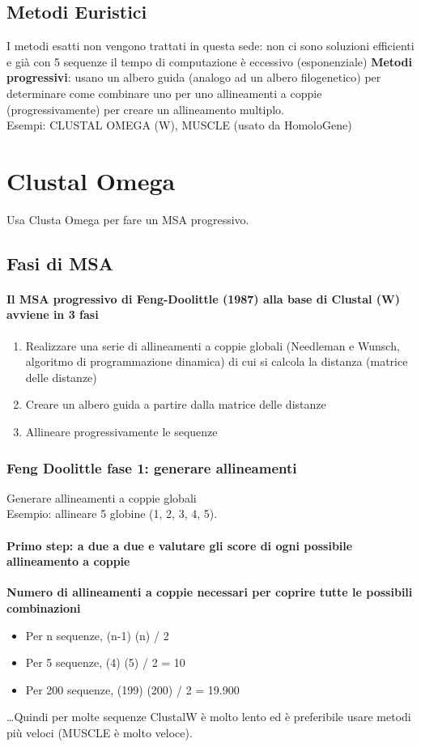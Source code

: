 \documentclass{article}
\begin{document}
\subsection{Metodi Euristici}
I metodi esatti non vengono trattati in questa sede: non ci sono soluzioni efficienti e già con 5 sequenze il tempo di computazione è eccessivo (esponenziale)
\textbf{Metodi progressivi}: usano un albero guida (analogo ad un albero filogenetico) per determinare come combinare uno per uno allineamenti a coppie
(progressivamente) per creare un allineamento multiplo.\\
Esempi: CLUSTAL OMEGA (W), MUSCLE (usato da HomoloGene)
\section{Clustal Omega}
Usa Clusta Omega per fare un MSA progressivo.
\subsection{Fasi di MSA}
\paragraph{Il MSA progressivo di Feng-Doolittle (1987) alla base di Clustal (W) avviene in 3 fasi}
\begin{enumerate}
    \item Realizzare una serie di allineamenti a coppie globali (Needleman e Wunsch, algoritmo di programmazione dinamica) di cui si calcola la distanza (matrice delle distanze)
    \item Creare un albero guida a partire dalla matrice delle distanze
    \item Allineare progressivamente le sequenze
\end{enumerate}
\subsubsection{Feng Doolittle fase 1: generare allineamenti}
\normalsize{Generare allineamenti a coppie globali}\\
\small{Esempio: allineare 5 globine (1, 2, 3, 4, 5).}\\
\paragraph{Primo step: a due a due e valutare gli score di ogni possibile allineamento a coppie\\}
\textbf{Numero di allineamenti a coppie necessari per coprire tutte le possibili combinazioni}
\begin{itemize}
    \item Per n sequenze, (n-1) (n) / 2
    \item Per 5 sequenze, (4) (5) / 2 = 10
    \item Per 200 sequenze, (199) (200) / 2 = 19.900
\end{itemize}…Quindi per molte sequenze ClustalW è molto lento ed è preferibile usare metodi più veloci (MUSCLE è molto veloce).
\end{document}
